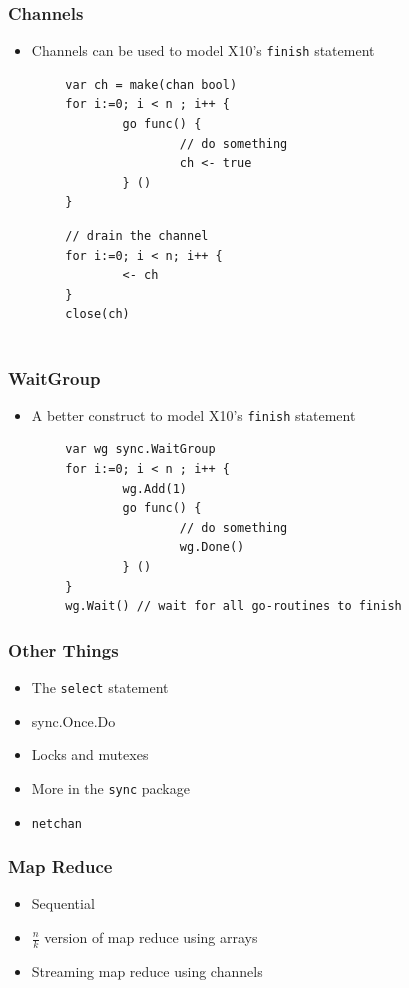 \documentclass{beamer}
\begin{document}
\begin{frame}[fragile]
\frametitle{Channels}
\begin{itemize}
\item Channels can be used to model X10's \verb=finish= statement
\end{itemize}
\begin{verbatim}
        var ch = make(chan bool)
        for i:=0; i < n ; i++ {
                go func() { 
                        // do something
                        ch <- true
                } ()
        }
\end{verbatim}
\pause
\begin{verbatim}
        // drain the channel
        for i:=0; i < n; i++ {
                <- ch
        }
        close(ch)
        
\end{verbatim}
\end{frame}


\begin{frame} [fragile]
\frametitle{WaitGroup}
\begin{itemize}
\item A better construct to model X10's \verb=finish= statement
\end{itemize}
\begin{verbatim}
        var wg sync.WaitGroup
        for i:=0; i < n ; i++ {
                wg.Add(1)
                go func() { 
                        // do something
                        wg.Done()
                } ()                
        }
        wg.Wait() // wait for all go-routines to finish
\end{verbatim}
\end{frame}

\begin{frame} [fragile]
\frametitle{Other Things}
\begin{itemize}
\item The \verb=select= statement
\item sync.Once.Do
\item Locks and mutexes
\item More in the \verb=sync= package
\item \verb=netchan= 
\end{itemize}
\end{frame}


\begin{frame}[fragile] 
\frametitle{Map Reduce}
\begin{itemize}
  \item Sequential
  \item $\frac{n}{k}$ version of map reduce using arrays
  \item Streaming map reduce using channels
\end{itemize}
\end{frame}
\end{document}

